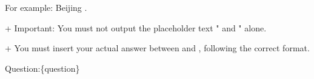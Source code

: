 \begin{tcolorbox}[
    mygreenbox,
    enhanced jigsaw,
    width=\textwidth,
    notitle,
    before upper={
        \setlength{\parindent}{0pt}
        \setlength{\parskip}{0pt}
    }
]

For example:  Beijing .  \par\noindent
+ Important: You must not output the placeholder text " and " alone.  \par\noindent
+ You must insert your actual answer between  and , following the correct format.  \par\noindent
Question:\{question\}


\end{tcolorbox}

\label{fig:graphrag-router-instruction}







